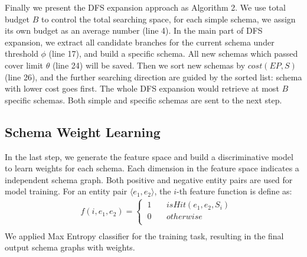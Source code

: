 Finally we present the DFS expansion approach as Algorithm 2.
We use total budget $B$ to control the total searching space,
for each simple schema, we assign its own budget as an average number (line 4).
In the main part of DFS expansion, we extract all candidate branches
for the current schema under threshold $\phi$ (line 17), and build a
specific schema.
All new schemas which passed cover limit $\theta$ (line 24)
will be saved.
Then we sort new schemas by $cost(EP,S)$ (line 26), and the further searching
direction are guided by the sorted list: schema with lower cost goes first.
The whole DFS expansion would retrieve at most $B$ specific schemas.
Both simple and specific schemas are sent to the next step.


\subsection{Schema Weight Learning}
In the last step, we generate the feature space and build a discriminative
model to learn weights for each schema.
Each dimension in the feature space indicates a independent schema graph.
Both positive and negative entity pairs are used for model training.
For an entity pair $\langle e_1, e_2 \rangle$, the $i$-th feature function
is define as:
\begin{equation}
\begin{aligned}
    &f(i, e_1, e_2)      = \left\{
        \begin{aligned}
        \ 1 & ~     & isHit(e_1, e_2, S_i)  \\
        \ 0 & ~     & otherwise \\
        \end{aligned}
	\right.	\\
\end{aligned}
\end{equation}
We applied Max Entropy classifier for the training task, resulting in the
final output schema graphs with weights.
